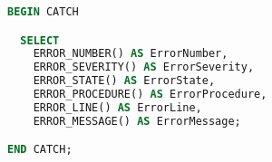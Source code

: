 \begin{lstlisting}[language=SQL, caption=Blok CATCH w skrypcie tworzącym, label={lst:catch}]
BEGIN CATCH

  SELECT
    ERROR_NUMBER() AS ErrorNumber,
    ERROR_SEVERITY() AS ErrorSeverity,
    ERROR_STATE() AS ErrorState,
    ERROR_PROCEDURE() AS ErrorProcedure,
    ERROR_LINE() AS ErrorLine,
    ERROR_MESSAGE() AS ErrorMessage;

END CATCH;
\end{lstlisting}
